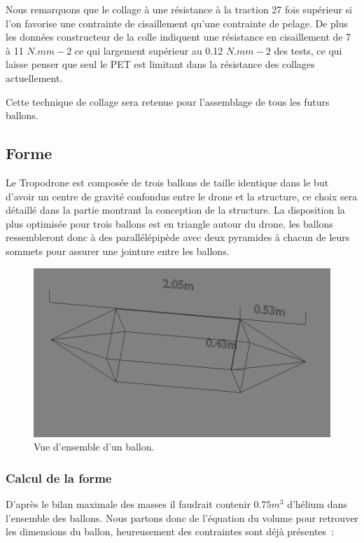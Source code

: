 \documentclass[a4paper,11pt]{article}
\begin{document}
Nous remarquons que le collage à une résistance à la traction 27 fois supérieur si l'on favorise une contrainte de cisaillement qu'une contrainte de pelage.
De plus les données constructeur de la colle indiquent une résistance en cisaillement de 7 à 11 $N.mm-2$ ce qui largement supérieur au 0.12 $N.mm-2$ des tests, ce qui laisse penser que seul le PET est limitant dans la résistance des collages actuellement.


Cette technique de collage sera retenue pour l'assemblage de tous les futurs ballons.

\subsection{Forme}

Le Tropodrone est composée de trois ballons de taille identique dans le but d'avoir un centre de gravité confondus entre le drone et la structure, ce choix sera détaillé dans la partie montrant la conception de la structure.
La disposition la plus optimisée pour trois ballons est en triangle autour du drone, les ballons ressembleront donc à des parallélépipède avec deux pyramides à chacun de leurs sommets pour assurer une jointure entre les ballons.

\begin{figure}[H]
	\centering
 \includegraphics[width=12cm]{../Images/ballon.png}
 \caption{Vue d'ensemble d'un ballon.}
\end{figure}

\subsubsection{Calcul de la forme}

D'après le bilan maximale des masses il faudrait contenir $0.75m^3$ d'hélium dans l'ensemble des ballons. Nous partons donc de l'équation du volume pour retrouver les dimensions du ballon, heureusement des contraintes sont déjà présentes~:
\end{document}
